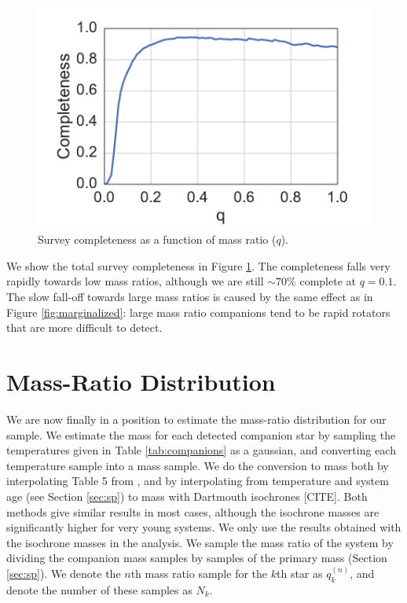 \documentclass{emulateapj}
\begin{document}
\begin{figure}
\includegraphics[width=\columnwidth]{SurveyCompleteness.pdf}
\caption{Survey completeness as a function of mass ratio ($q$).}
\label{fig:completeness}
\end{figure}

We show the total survey completeness in Figure \ref{fig:completeness}. The completeness falls very rapidly towards low mass ratios, although we are still $\sim 70\%$ complete at $q = 0.1$. The slow fall-off towards large mass ratios is caused by the same effect as in Figure \ref{fig:marginalized}: large mass ratio companions tend to be rapid rotators that are more difficult to detect.

\section{Mass-Ratio Distribution}
\label{sec:mrd}

We are now finally in a position to estimate the mass-ratio distribution for our sample. We estimate the mass for each detected companion star by sampling the temperatures given in Table \ref{tab:companions} as a gaussian, and converting each temperature sample into a mass sample. We do the conversion to mass both by interpolating Table 5 from \citet{Pecaut2013}, and by interpolating from temperature and system age (see Section \ref{sec:sp}) to mass with Dartmouth isochrones [CITE]. Both methods give similar results in most cases, although the isochrone masses are significantly higher for very young systems. We only use the results obtained with the isochrone masses in the analysis. We sample the mass ratio of the system by dividing the companion mass samples by samples of the primary mass (Section \ref{sec:sp}). We denote the $n$th mass ratio sample for the $k$th star as $q_k^{(n)}$, and denote the number of these samples as $N_k$.
\end{document}
